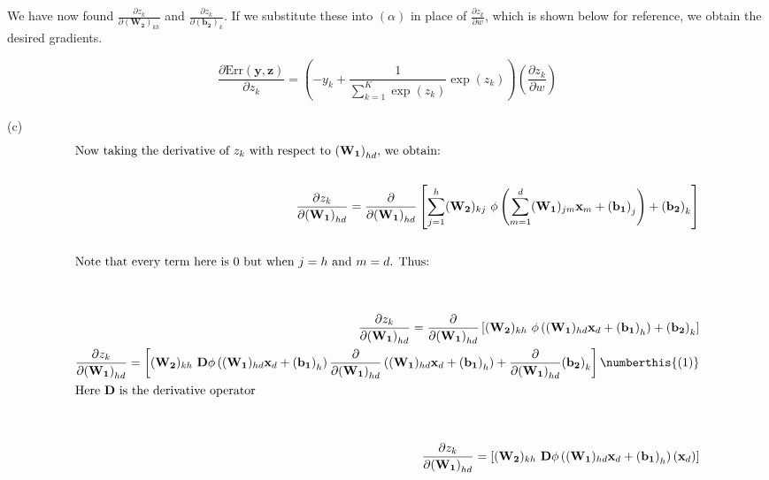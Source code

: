 \documentclass[../main.tex]{subfiles}
\begin{document}
We have now found $\frac{\partial z_k}{\partial \mathbf{(W_2)}_{kh}}$ and $\frac{\partial z_k}{\partial \mathbf{(b_2)}_k}$. If we substitute these into $(\alpha)$ in place of $\frac{\partial z_{k}}{\partial w}$, which is shown below for reference, we obtain the desired gradients.

\[
    \frac{\partial \text{Err}(\mathbf{y},\mathbf{z})}{\partial z_k} = \left(-y_k +  \frac{1}{\sum_{k=1}^{K}\exp{\left( z_{k} \right)}}  \exp{\left( z_{k} \right)}\right)\left(\frac{\partial z_{k}}{\partial w} \right) 
\] \\



(c) \\

\begin{align*}
    \intertext{Now taking the derivative of $z_k$ with respect to $\mathbf{(W_1)}_{hd}$, we obtain:} \\
    \frac{\partial z_k}{\partial \mathbf{(W_1)}_{hd}} = \frac{\partial }{\partial \mathbf{(W_1)}_{hd}} \left[\sum_{j=1}^{h}(\mathbf{W_2})_{kj} \  \phi\left( \sum_{m=1}^{d}(\mathbf{W_1})_{jm}\mathbf{x}_{m} + \mathbf{(b_1)}_{j} \right)  + \mathbf{(b_2)}_{k}\right] \\
    \\
    \intertext{Note that every term here is $0$ but when $j = h$ and $m = d$. Thus:} \\
    \\
    \frac{\partial z_k}{\partial \mathbf{(W_1)}_{hd}} = \frac{\partial }{\partial \mathbf{(W_1)}_{hd}} \left[(\mathbf{W_2})_{kh} \  \phi\left( (\mathbf{W_1})_{hd}\mathbf{x}_{d} + \mathbf{(b_1)}_{h} \right)  + \mathbf{(b_2)}_{k}\right] \\
    \frac{\partial z_k}{\partial \mathbf{(W_1)}_{hd}} =  \left[(\mathbf{W_2})_{kh} \  \mathbf{D}\phi\left( (\mathbf{W_1})_{hd}\mathbf{x}_{d} + \mathbf{(b_1)}_{h}\right)  \frac{\partial }{\partial \mathbf{(W_1)}_{hd}}\left((\mathbf{W_1})_{hd}\mathbf{x}_{d} + \mathbf{(b_1)}_{h} \right)  + \frac{\partial }{\partial \mathbf{(W_1)}_{hd}} \mathbf{(b_2)}_{k}\right] \numberthis{(1)} \\
    \intertext{Here $\mathbf{D}$ is the derivative operator} \\
    \\
    \frac{\partial z_k}{\partial \mathbf{(W_1)}_{hd}} =  \left[(\mathbf{W_2})_{kh} \  \mathbf{D}\phi\left( (\mathbf{W_1})_{hd}\mathbf{x}_{d} + \mathbf{(b_1)}_{h}\right) \left(\mathbf{x}_{d} \right)  \right] \\
\\

\end{align*}
\end{document}
